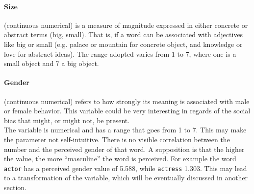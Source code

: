 \documentclass[a4paper,11pt,dvipsnames]{article}
\begin{document}

\paragraph{Size} (continuous numerical) is a measure of magnitude expressed in either concrete or abstract terms (big, small). That is, if a word can be associated with adjectives like big or small (e.g. palace or mountain for concrete object, and knowledge or love for abstract ideas). The range adopted varies from 1 to 7, where one is a small object and 7 a big object. 

\paragraph{Gender} (continuous numerical) refers to how strongly its meaning is associated with male or female behavior. This variable could be very interesting in regards of the social bias that might, or might not, be present. \\
The variable is numerical and has a range that goes from 1 to 7. 
This may make the parameter not self-intuitive. There is no visible correlation between the number and the perceived gender of that word. A supposition is that the higher the value, the more ``masculine'' the word is perceived. For example the word \texttt{actor} has a perceived gender value of 5.588, while \texttt{actress} 1.303. This may lead to a transformation of the variable, which will be eventually discussed in another section.

\end{document}
